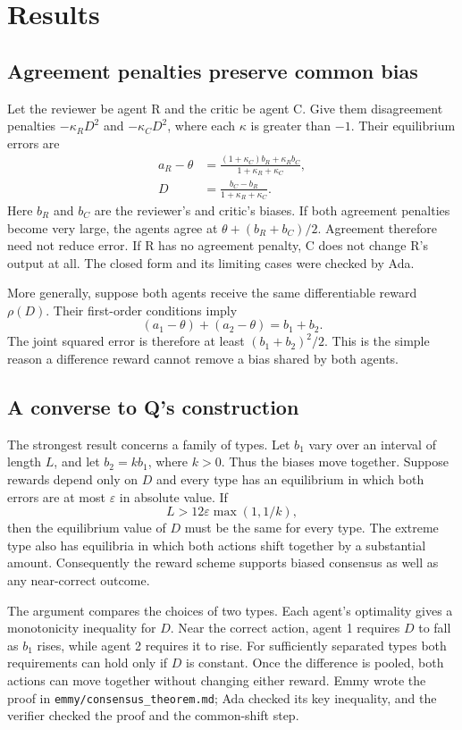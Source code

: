 \documentclass{article}
\begin{document}
\section{Results}

\subsection{Agreement penalties preserve common bias}

Let the reviewer be agent R and the critic be agent C. Give them disagreement penalties $-\kappa_R D^2$ and $-\kappa_C D^2$, where each $\kappa$ is greater than $-1$. Their equilibrium errors are
\begin{align*}
a_R-\theta&=\frac{(1+\kappa_C)b_R+\kappa_R b_C}
{1+\kappa_R+\kappa_C},\\
D&=\frac{b_C-b_R}{1+\kappa_R+\kappa_C}.
\end{align*}
Here $b_R$ and $b_C$ are the reviewer's and critic's biases. If both agreement penalties become very large, the agents agree at $\theta+(b_R+b_C)/2$. Agreement therefore need not reduce error. If R has no agreement penalty, C does not change R's output at all. The closed form and its limiting cases were checked by Ada.

More generally, suppose both agents receive the same differentiable reward $\rho(D)$. Their first-order conditions imply
\[
(a_1-\theta)+(a_2-\theta)=b_1+b_2.
\]
The joint squared error is therefore at least $(b_1+b_2)^2/2$. This is the simple reason a difference reward cannot remove a bias shared by both agents.

\subsection{A converse to Q's construction}

The strongest result concerns a family of types. Let $b_1$ vary over an interval of length $L$, and let $b_2=k b_1$, where $k>0$. Thus the biases move together. Suppose rewards depend only on $D$ and every type has an equilibrium in which both errors are at most $\varepsilon$ in absolute value. If
\[
L>12\varepsilon\max(1,1/k),
\]
then the equilibrium value of $D$ must be the same for every type. The extreme type also has equilibria in which both actions shift together by a substantial amount. Consequently the reward scheme supports biased consensus as well as any near-correct outcome.

The argument compares the choices of two types. Each agent's optimality gives a monotonicity inequality for $D$. Near the correct action, agent 1 requires $D$ to fall as $b_1$ rises, while agent 2 requires it to rise. For sufficiently separated types both requirements can hold only if $D$ is constant. Once the difference is pooled, both actions can move together without changing either reward. Emmy wrote the proof in \texttt{emmy/consensus\_theorem.md}; Ada checked its key inequality, and the verifier checked the proof and the common-shift step.
\end{document}
